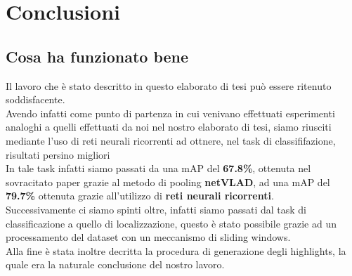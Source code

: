 \chapter{Conclusioni}\label{ch:conclusioni}
\section{Cosa ha funzionato bene}
Il lavoro che è stato descritto in questo elaborato di tesi può essere ritenuto soddisfacente.
\\Avendo infatti come punto di partenza \cite{soccerNet} in cui venivano effettuati esperimenti analoghi a quelli effettuati da noi nel nostro elaborato di tesi, siamo riusciti mediante l'uso di reti neurali ricorrenti ad ottnere, nel task di classififazione, risultati persino migliori
\\In tale task infatti siamo passati da una mAP del\textbf{ 67.8\%}, ottenuta nel sovracitato paper grazie al metodo di pooling \textbf{netVLAD}, ad una mAP del \textbf{79.7\%} ottenuta grazie all'utilizzo di \textbf{reti neurali ricorrenti}.
\\Successivamente ci siamo spinti oltre, infatti siamo passati dal task di classificazione a quello di localizzazione, questo è stato possibile grazie ad un processamento del dataset con un meccanismo di sliding windows.
\\Alla fine è stata inoltre decritta la procedura di generazione degli highlights, la quale era la naturale conclusione del nostro lavoro.
